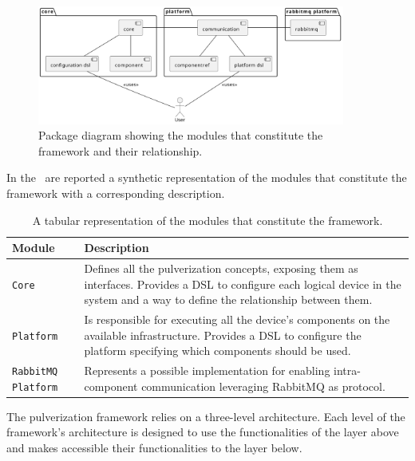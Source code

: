 \begin{figure}
	\centering
	\includegraphics[width=0.9\textwidth]{figures/package-diagram.pdf}
	\caption{Package diagram showing the modules that constitute the framework and their relationship.}
	\label{fig:package-diagram}
\end{figure}

In the~ are reported a synthetic representation of the modules that constitute the framework with a corresponding
description.

\begin{table}
	\begin{tabularx}{\textwidth}{l X}
		\toprule
		\textbf{Module}            & \textbf{Description}
		\\ \midrule
		\texttt{Core}              & Defines all the pulverization concepts, exposing them as interfaces.
		Provides a DSL to configure each logical device in the system and a way to define the relationship between them.                              \\
		\texttt{Platform}          & Is responsible for executing all the device's components on the available infrastructure.
		Provides a DSL to configure the platform specifying which components should be used.                                                          \\
		\texttt{RabbitMQ Platform} & Represents a possible implementation for enabling intra-component communication leveraging RabbitMQ as protocol. \\ \bottomrule
	\end{tabularx}
	\caption{A tabular representation of the modules that constitute the framework.}
	\label{tab:framework-modules}
\end{table}

The pulverization framework relies on a three-level architecture. Each level of the framework's architecture is designed to use the functionalities
of the layer above and makes accessible their functionalities to the layer below.

